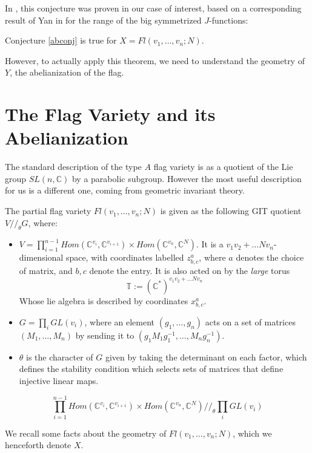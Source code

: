 \documentclass[11pt,letterpaper]{amsart}
\begin{document}
In \cite{me}, this conjecture was proven in our case of interest, based on a corresponding result of Yan in \cite{Xiaohanflag} for the range of the big symmetrized $J$-functions:
\begin{thm}
    Conjecture \ref{abconj} is true for $X=Fl(v_1,\dots,v_n;N)$. 
\end{thm}


However, to actually apply this theorem, we need to understand the geometry of $Y$, the abelianization of the flag. 

\section{The Flag Variety and its Abelianization}

The standard description of the type $A$ flag variety is as a quotient of the Lie group $SL(n,\mathbb{C})$ by a parabolic subgroup. However the most useful description for us is a different one, coming from geometric invariant theory. 



The partial flag variety $Fl(v_1,\dots,v_n; N)$ is given as the following GIT quotient $V//_\theta G$, where:

\begin{itemize}
    \item $V=\prod_{i=1}^{n-1}Hom(\mathbb{C}^{v_i},\mathbb{C}^{v_{i+1}})\times Hom(\mathbb{C}^{v_n},\mathbb{C}^N)$. It is a $v_1v_2+\dots Nv_{n}$-dimensional space, with coordinates labelled $z^a_{b,c}$, where $a$ denotes the choice of matrix, and $b,c$ denote the entry. It is also acted on by the \textit{large} torus $$\mathbb{T}:=(\mathbb{C}^*)^{v_1v_2+\dots Nv_n}$$
    Whose lie algebra is described by coordinates $x^a_{b,c}$. 

    \item $G=\prod_i GL(v_i)$, where an element $(g_1,\dots, g_n)$ acts on a set of matrices $(M_1,\dots,M_n)$ by sending it to $(g_1M_1g_1^{-1},\dots, M_n g_n^{-1})$.
    \item $\theta$ is the character of $G$ given by taking the determinant on each factor, which defines the stability condition which selects sets of matrices that define injective linear maps. 
\end{itemize}


$$\prod_{i=1}^{n-1}Hom(\mathbb{C}^{v_i},\mathbb{C}^{v_{i+1}})\times Hom(\mathbb{C}^{v_n},\mathbb{C}^N)//_{\theta}\prod_i GL(v_i)$$


We recall some facts about the geometry of $Fl(v_1,\dots,v_n;N)$, which we henceforth denote $X$. 
\end{document}
